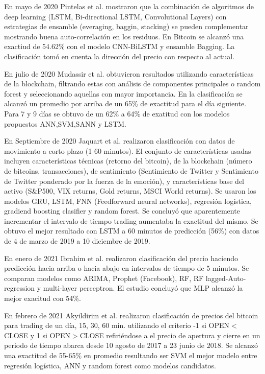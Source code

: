 En mayo de 2020 Pintelas et al. \cite{pintelasInvestigatingProblemCryptocurrency2020} mostraron que la combinación de algoritmos de deep learning (LSTM, Bi-directional LSTM, Convolutional Layers) con estrategias de ensamble (everaging, baggin, stacking) se pueden complementar mostrando buena auto-correlación en los residuos.  En Bitcoin se alcanzó una exactiud de 54.62\% con el modelo CNN-BiLSTM y ensamble Bagging. La clasificación tomó en cuenta la dirección del precio con respecto al actual.

En julio de 2020 Mudassir et al. \cite{mudassirTimeseriesForecastingBitcoin2020} obtuvieron resultados utilizando características de la blockchain, filtrando estas con análisis de componentes principales o random forest y seleccionando aquellas con mayor importancia. En la clasificación se alcanzó un promedio por arriba de un 65\% de exactitud para el día siguiente. Para 7 y 9 días se obtuvo de un 62\% a 64\% de exatitud con los modelos propuestos ANN,SVM,SANN y LSTM. 

En Septiembre de 2020 Jaquart et al. \cite{jaquartShorttermBitcoinMarket2021} realizaron clasificación con datos de movimiento a corto plazo (1-60 minutos). El conjunto de características usadas incluyen características técnicas (retorno del bitcoin), de la blockchain (número de bitcoins, transacciones), de sentimiento (Sentimiento de Twitter y Sentimiento de Twitter ponderado por la fuerza de la emoción), y características base del activo (S\&P500, VIX returns, Gold returns, MSCI World returns). Se usaron los modelos GRU, LSTM, FNN (Feedforward neural networks), regresión logística, gradiend boosting clasifier y random forest. Se concluyó que aparentemente incrementar el intervalo de tiempo trading aumentaba la exactitud del mismo. Se obtuvo el mejor resultado con LSTM a 60 minutos de predicción (56\%) con datos de 4 de marzo de 2019 a 10 diciembre de 2019.

En enero de 2021 Ibrahim et al. \cite{ibrahimPredictingMarketMovement2021} realizaron clasificación del precio haciendo predicción hacia arriba o hacia abajo en intervalos de tiempo de 5 minutos. Se comparan modelos como ARIMA, Prophet (Facebook), RF, RF lagged-Auto-regression y multi-layer perceptron. El estudio concluyó que MLP alcanzó la mejor exacitud con 54\%.

En febrero de 2021 Akyildirim et al. \cite{akyildirimPredictionCryptocurrencyReturns2021} realizaron clasificación de precios del bitcoin para trading de un día, 15, 30, 60 min. utilizando el criterio -1 si OPEN$<$CLOSE y 1 si OPEN$>$CLOSE refiriéndose a el precio de apertura y cierre en un periodo de tiempo abarca desde 10 agosto de 2017 a 23 junio de 2018. Se alcanzó una exactitud de 55-65\% en promedio resultando ser SVM el mejor modelo entre regresión logística, ANN y random forest como modelos candidatos.

